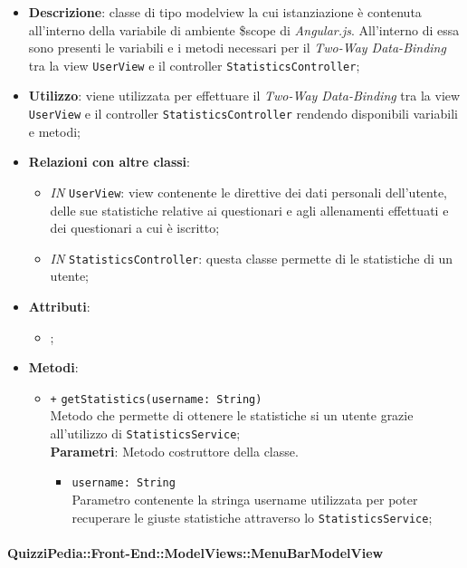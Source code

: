 \begin{itemize}
	\item \textbf{Descrizione}: classe di tipo modelview la cui istanziazione è contenuta all'interno della variabile di ambiente \$scope di \textit{Angular.js}. All'interno di essa sono presenti le variabili e i metodi necessari per il \textit{Two-Way Data-Binding} tra la view \texttt{UserView} e il controller \texttt{StatisticsController};
	\item \textbf{Utilizzo}: viene utilizzata per effettuare il \textit{Two-Way Data-Binding} tra la view \texttt{UserView} e il controller \texttt{StatisticsController} rendendo disponibili variabili e metodi;
	\item \textbf{Relazioni con altre classi}: 
	\begin{itemize}
		\item \textit{IN} \texttt{UserView}: view contenente le direttive dei dati personali dell'utente, delle sue statistiche relative ai questionari e agli allenamenti effettuati e dei questionari a cui è iscritto; 
		\item \textit{IN} \texttt{StatisticsController}: questa classe permette di le statistiche di un utente;
	\end{itemize}
	\item \textbf{Attributi}: 
	\begin{itemize}
		\item ;
	\end{itemize}
	\item \textbf{Metodi}: 
	\begin{itemize}
		\item \texttt{+} \texttt{getStatistics(username: String)} \\ 
		Metodo che permette di ottenere le statistiche si un utente grazie all'utilizzo di \texttt{StatisticsService}; \\
		\textbf{Parametri}: 
		Metodo costruttore della classe. \\
		\begin{itemize}
			\item \texttt{username: String} \\
			Parametro contenente la stringa username utilizzata per poter recuperare le giuste statistiche attraverso lo \texttt{StatisticsService}; 
		\end{itemize}
	\end{itemize}
\end{itemize}	

\paragraph{QuizziPedia::Front-End::ModelViews::MenuBarModelView}


